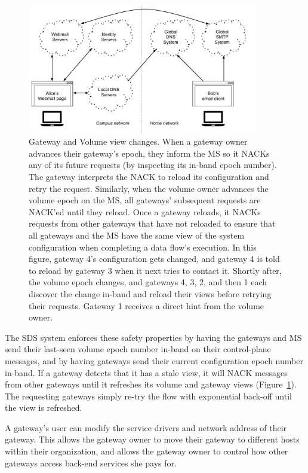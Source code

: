 \begin{figure}[h!]
   \centering
   \includegraphics[width=0.9\textwidth,page=12]{figures/dissertation-figures}
   \caption{Gateway and Volume view changes.  When a gateway owner advances
   their gateway's epoch, they inform the MS so it NACKs any of its future
   requests (by inspecting its in-band epoch number).  The gateway interprets
   the NACK to reload its configuration and retry the request.  Similarly, when
   the volume owner advances the volume epoch on the MS, all gateways'
   subsequent requests are NACK'ed until they reload.  Once a gateway reloads,
   it NACKs requests from other gateways that have not reloaded to ensure that
   all gateways and the MS have the same view of the system configuration
   when completing a data flow's execution.  In this figure, gateway 4's
   configuration gets changed, and gateway 4 is told to reload by gateway 3 when it
   next tries to contact it.  Shortly after, the volume epoch changes, and
   gateways 4, 3, 2, and then 1 each discover the change in-band and reload
   their views before retrying their requests.  Gateway 1 receives a direct hint
   from the volume owner.}
   \label{fig:chap2-view-changes}
\end{figure}

The SDS system enforces these safety properties by having the gateways and MS
send their last-seen volume epoch number in-band on their control-plane messages,
and by having gateways send their
current configuration epoch number in-band.  If a gateway detects that it has a stale
view, it will NACK messages from other gateways until it refreshes its volume
and gateway views (Figure~\ref{fig:chap2-view-changes}).
The requesting gateways simply re-try the flow with
exponential back-off until the view is refreshed.

A gateway's user can modify the service drivers and network address of their
gateway.  This allows the gateway owner to move their gateway to different hosts
within their organization, and allows the gateway owner to control how other gateways
access back-end services she pays for.


